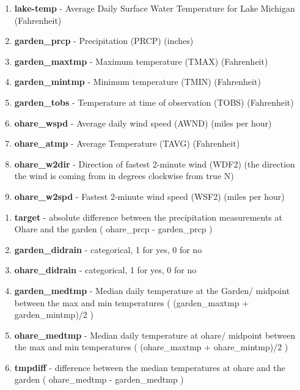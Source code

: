 \documentclass[10pt]{article}
\begin{document}
\begin{enumerate}[\null]
\begin{enumerate}
\item[] \textbf{lake-temp} - Average Daily Surface Water Temperature for Lake Michigan 	(Fahrenheit) 
 \item[] \textbf{garden\_prcp} - Precipitation (PRCP) (inches)
 \item[] \textbf{garden\_maxtmp} - Maximum temperature (TMAX) (Fahrenheit)
 \item[] \textbf{garden\_mintmp} - Minimum temperature (TMIN) (Fahrenheit)
 \item[] \textbf{garden\_tobs} - Temperature at time of observation (TOBS) (Fahrenheit)
 \item[] \textbf{ohare\_wspd} - Average daily wind speed (AWND) (miles per hour) 
 \item[] \textbf{ohare\_atmp} - Average Temperature (TAVG) (Fahrenheit)
 \item[] \textbf{ohare\_w2dir} - Direction of fastest 2-minute wind (WDF2) (the direction the wind is coming from in degrees clockwise from true N)  
 \item[] \textbf{ohare\_w2spd} - Fastest 2-minute wind speed (WSF2) (miles per hour)
\end{enumerate}

\begin{enumerate}
 \item[] \textbf{target} - absolute difference between the precipitation measurements at Ohare and the garden ( ohare\_prcp - garden\_prcp )
 \item[] \textbf{garden\_didrain} - categorical, 1 for yes, 0 for no
 \item[] \textbf{ohare\_didrain} - categorical, 1 for yes, 0 for no
 \item[] \textbf{garden\_medtmp} - Median daily temperature at the Garden/ midpoint between the max and min temperatures ( (garden\_maxtmp + garden\_mintmp)/2 )
 \item[] \textbf{ohare\_medtmp} - Median daily temperature at ohare/ midpoint between the max and min temperatures ( (ohare\_maxtmp + ohare\_mintmp)/2 )
 \item[] \textbf{tmpdiff} - difference between the median temperatures at ohare and the garden ( ohare\_medtmp - garden\_medtmp )
 \end{enumerate}  
 
  








\end{enumerate}
\end{document}
